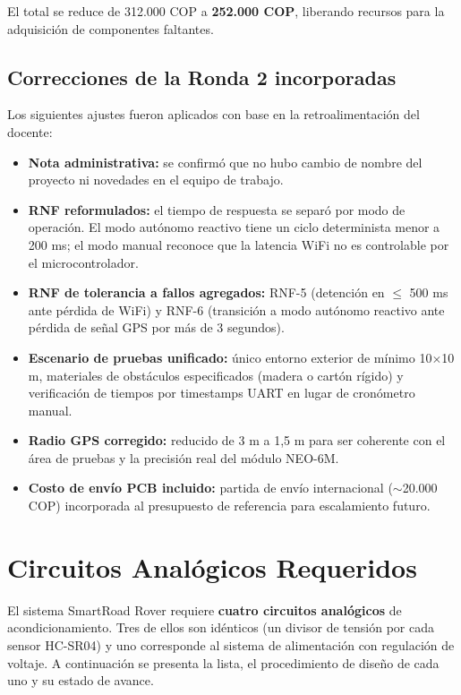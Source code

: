 \documentclass[12pt]{report}
\begin{document}
El total se reduce de 312.000 COP a \textbf{252.000 COP}, liberando recursos para la adquisición de componentes faltantes.

\section{Correcciones de la Ronda 2 incorporadas}

Los siguientes ajustes fueron aplicados con base en la retroalimentación del docente:

\begin{itemize}
    \item \textbf{Nota administrativa:} se confirmó que no hubo cambio de nombre del proyecto ni novedades en el equipo de trabajo.
    \item \textbf{RNF reformulados:} el tiempo de respuesta se separó por modo de operación. El modo autónomo reactivo tiene un ciclo determinista menor a 200 ms; el modo manual reconoce que la latencia WiFi no es controlable por el microcontrolador.
    \item \textbf{RNF de tolerancia a fallos agregados:} RNF-5 (detención en $\leq$ 500 ms ante pérdida de WiFi) y RNF-6 (transición a modo autónomo reactivo ante pérdida de señal GPS por más de 3 segundos).
    \item \textbf{Escenario de pruebas unificado:} único entorno exterior de mínimo 10$\times$10 m, materiales de obstáculos especificados (madera o cartón rígido) y verificación de tiempos por timestamps UART en lugar de cronómetro manual.
    \item \textbf{Radio GPS corregido:} reducido de 3 m a 1,5 m para ser coherente con el área de pruebas y la precisión real del módulo NEO-6M.
    \item \textbf{Costo de envío PCB incluido:} partida de envío internacional ($\sim$20.000 COP) incorporada al presupuesto de referencia para escalamiento futuro.
\end{itemize}

\chapter{Circuitos Analógicos Requeridos}

El sistema SmartRoad Rover requiere \textbf{cuatro circuitos analógicos} de acondicionamiento. Tres de ellos son idénticos (un divisor de tensión por cada sensor HC-SR04) y uno corresponde al sistema de alimentación con regulación de voltaje. A continuación se presenta la lista, el procedimiento de diseño de cada uno y su estado de avance.
\end{document}

